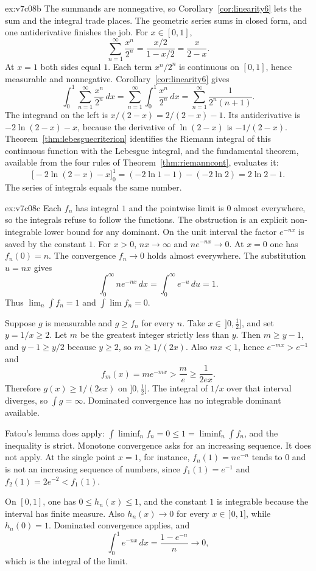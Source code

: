 \begin{solution}{ex:v7c08b}
\idea The summands are nonnegative, so Corollary~\ref{cor:linearity6} lets the sum and the integral trade places. The geometric series sums in closed form, and one antiderivative finishes the job.
\writeup For \(x\in[0,1]\),
\[
\sum_{n=1}^\infty\frac{x^n}{2^n}=\frac{x/2}{1-x/2}=\frac{x}{2-x}.
\]
At \(x=1\) both sides equal \(1\). Each term \(x^n/2^n\) is continuous on \([0,1]\), hence measurable and nonnegative. Corollary~\ref{cor:linearity6} gives
\[
\int_0^1\sum_{n=1}^\infty\frac{x^n}{2^n}\,dx=\sum_{n=1}^\infty\int_0^1\frac{x^n}{2^n}\,dx=\sum_{n=1}^\infty\frac1{2^n(n+1)}.
\]
The integrand on the left is \(x/(2-x)=2/(2-x)-1\). Its antiderivative is \(-2\ln(2-x)-x\), because the derivative of \(\ln(2-x)\) is \(-1/(2-x)\). Theorem~\ref{thm:lebesguecriterion} identifies the Riemann integral of this continuous function with the Lebesgue integral, and the fundamental theorem, available from the four rules of Theorem~\ref{thm:riemanncont}, evaluates it:
\[
\bigl[-2\ln(2-x)-x\bigr]_0^1=(-2\ln1-1)-(-2\ln2)=2\ln2-1.
\]
The series of integrals equals the same number.
\end{solution}

\begin{solution}{ex:v7c08c}
\idea Each \(f_n\) has integral \(1\) and the pointwise limit is \(0\) almost everywhere, so the integrals refuse to follow the functions. The obstruction is an explicit non-integrable lower bound for any dominant. On the unit interval the factor \(e^{-nx}\) is saved by the constant \(1\).
\writeup For \(x>0\), \(nx\to\infty\) and \(ne^{-nx}\to0\). At \(x=0\) one has \(f_n(0)=n\). The convergence \(f_n\to0\) holds almost everywhere. The substitution \(u=nx\) gives
\[
\int_0^\infty ne^{-nx}\,dx=\int_0^\infty e^{-u}\,du=1.
\]
Thus \(\lim_n\int f_n=1\) and \(\int\lim f_n=0\).

Suppose \(g\) is measurable and \(g\ge f_n\) for every \(n\). Take \(x\in\,]0,\frac12]\), and set \(y=1/x\ge2\). Let \(m\) be the greatest integer strictly less than \(y\). Then \(m\ge y-1\), and \(y-1\ge y/2\) because \(y\ge2\), so \(m\ge1/(2x)\). Also \(mx<1\), hence \(e^{-mx}>e^{-1}\) and
\[
f_m(x)=me^{-mx}>\frac m e\ge\frac1{2ex}.
\]
Therefore \(g(x)\ge1/(2ex)\) on \(]0,\frac12]\). The integral of \(1/x\) over that interval diverges, so \(\int g=\infty\). Dominated convergence has no integrable dominant available.

Fatou's lemma does apply: \(\int\liminf_nf_n=0\le1=\liminf_n\int f_n\), and the inequality is strict. Monotone convergence asks for an increasing sequence. It does not apply. At the single point \(x=1\), for instance, \(f_n(1)=ne^{-n}\) tends to \(0\) and is not an increasing sequence of numbers, since \(f_1(1)=e^{-1}\) and \(f_2(1)=2e^{-2}<f_1(1)\).

On \([0,1]\), one has \(0\le h_n(x)\le1\), and the constant \(1\) is integrable because the interval has finite measure. Also \(h_n(x)\to0\) for every \(x\in\,]0,1]\), while \(h_n(0)=1\). Dominated convergence applies, and
\[
\int_0^1e^{-nx}\,dx=\frac{1-e^{-n}}n\to0,
\]
which is the integral of the limit.
\end{solution}


